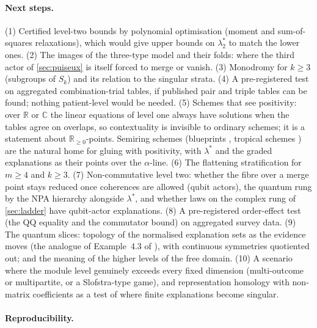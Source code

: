 \documentclass[11pt]{article}
\theoremstyle{definition}\newtheorem{definition}[theorem]{Definition}\newtheorem{remark}[theorem]{Remark}\newtheorem{example}[theorem]{Example}
\newcommand{\R}{\mathbb R}
\begin{document}
\paragraph{Next steps.}
(1) Certified level-two bounds by polynomial optimisation (moment and sum-of-squares relaxations), which would give upper bounds on
$\lambda^*_2$ to match the lower ones. (2) The images of the three-type model and their folds: where the third actor of
\cref{sec:puiseux} is itself forced to merge or vanish. (3) Monodromy for $k\ge3$ (subgroups of $S_k$) and its relation to the
singular strata. (4) A pre-registered test on aggregated combination-trial tables, if published pair and triple tables can be found;
nothing patient-level would be needed. (5) Schemes that see positivity: over $\R$ or $\mathbb C$ the linear equations of level one always
have solutions when the tables agree on overlaps, so contextuality is invisible to ordinary schemes; it is a statement about
$\R_{\ge0}$-points. Semiring schemes (blueprints \cite{Lorscheid2012}, tropical schemes \cite{GiansiracusaGiansiracusa2016}) are the
natural home for gluing with positivity, with $\lambda^*$ and the graded explanations as their points over the $\alpha$-line.
(6) The flattening stratification for $m\ge4$ and $k\ge3$. (7) Non-commutative level two: whether the fibre over a merge point stays reduced once coherences are allowed (qubit actors), the
quantum rung by the NPA hierarchy alongside $\lambda^*$, and whether laws on the complex rung of \cref{sec:ladder} have qubit-actor
explanations. (8) A pre-registered order-effect test (the QQ equality and the commutator bound) on aggregated survey data. (9) The quantum slices:
topology of the normalised explanation sets as the evidence moves (the analogue of Example~4.3 of \cite{IVW2026}), with continuous
symmetries quotiented out; and the meaning of the higher levels of the free domain. (10) A scenario where the module level genuinely exceeds every
fixed dimension (multi-outcome or multipartite, or a Slofstra-type game), and representation homology with non-matrix coefficients
\cite{Li2026} as a test of where finite explanations become singular.

\paragraph{Reproducibility.}\begingroup\sloppy
\end{document}
